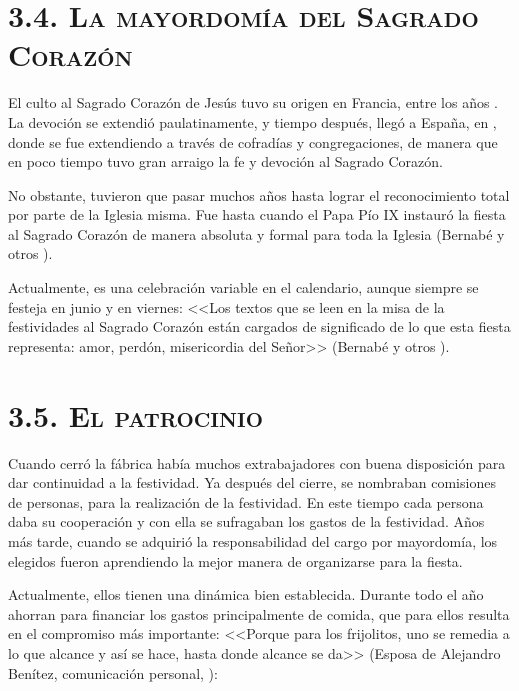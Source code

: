 \documentclass[14pt,letterpaper,twoside]{extbook} %
\begin{document}
\section*{\mdseries\large\textsc{3.4. La mayordomía del Sagrado Corazón}}

\noindent El culto al Sagrado Corazón de Jesús tuvo su origen en Francia, entre los años . La devoción se extendió paulatinamente, y tiempo después, llegó a España, en , donde se fue extendiendo a través de cofradías y congregaciones, de manera que en poco tiempo tuvo gran arraigo la fe y devoción al Sagrado Corazón.

No obstante, tuvieron que pasar muchos años hasta lograr el reconocimiento total por parte de la Iglesia misma. Fue hasta  cuando el Papa Pío IX instauró la fiesta al Sagrado Corazón de manera absoluta y formal para toda la Iglesia (Bernabé y otros ).

Actualmente, es una celebración variable en el calendario, aunque siempre se festeja en junio y en viernes: <<Los textos que se leen en la misa de la festividades al Sagrado Corazón están cargados de significado de lo que esta fiesta representa: amor, perdón, misericordia del Señor>> (Bernabé y otros ).

\section*{\mdseries\large\textsc{3.5. El patrocinio}}

\noindent Cuando cerró la fábrica había muchos extrabajadores con buena disposición para dar continuidad a la festividad. Ya después del cierre, se nombraban comisiones de  personas, para la realización de la festividad. En este tiempo cada persona daba su cooperación y con ella se sufragaban los gastos de la festividad. Años más tarde, cuando se adquirió la responsabilidad del cargo por mayordomía, los elegidos fueron aprendiendo la mejor manera de organizarse para la fiesta.

Actualmente, ellos tienen una dinámica bien establecida. Durante todo el año ahorran para financiar los gastos principalmente de comida, que para ellos resulta en el compromiso más importante: <<Porque para los frijolitos, uno se remedia a lo que alcance y así se hace, hasta donde alcance se da>> (Esposa de Alejandro Benítez, comunicación personal, ):
\end{document}
